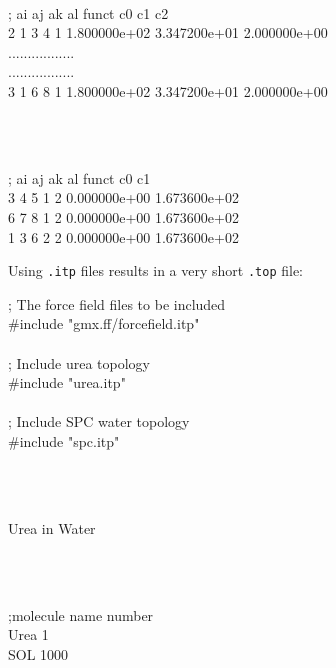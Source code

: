 \begin{tt}
[ dihedrals ]\\
;  ai    aj    ak    al funct           c0           c1           c2\\
    2     1     3     4     1 1.800000e+02 3.347200e+01 2.000000e+00 \\
     .................\\
     .................\\
    3     1     6     8     1 1.800000e+02 3.347200e+01 2.000000e+00 \\
\end{tt}\\
\begin{tt}
[ dihedrals ]\\
;  ai    aj    ak    al funct           c0           c1\\
    3     4     5     1     2 0.000000e+00 1.673600e+02 \\
    6     7     8     1     2 0.000000e+00 1.673600e+02 \\
    1     3     6     2     2 0.000000e+00 1.673600e+02 \\
\end{tt}

Using {\tt *.itp} files results in a very short {\tt *.top} file:

\begin{tt}
; The force field files to be included\\
\#include "gmx.ff/forcefield.itp"\\
  \\      
; Include urea topology\\
\#include "urea.itp"\\
\\
; Include SPC water topology\\
\#include "spc.itp"\\
\end{tt}\\
\begin{tt}
[ system ]\\
Urea in Water\\
\end{tt}\\
\begin{tt}
[ molecules ]\\
;molecule name  number\\
Urea              1\\
SOL               1000\\
\end{tt}

